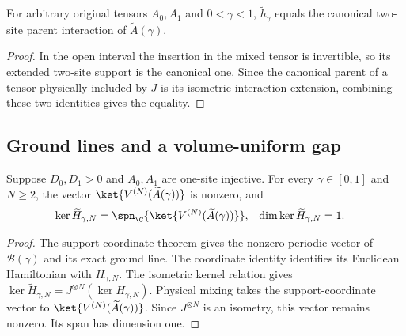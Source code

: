 \begin{lemma}
    \label{thm:mpo_arbitrary_interior_parent}
    \leanok
    For arbitrary original tensors $A_0,A_1$ and $0<\gamma<1$,
    $\widetilde h_\gamma$ equals the canonical two-site parent
    interaction of $\widetilde A(\gamma)$.
\end{lemma}
\begin{proof}\leanok
    In the open interval the insertion in the mixed tensor is invertible,
    so its extended two-site support is the canonical one. Since the
    canonical parent of a tensor physically included by $J$ is its
    isometric interaction extension, combining these two identities
    gives the equality.
\end{proof}

\subsection{Ground lines and a volume-uniform gap}

\begin{lemma}
    \label{thm:mpo_arbitrary_periodic_ground_line}
    \leanok
    Suppose $D_0,D_1>0$ and $A_0,A_1$ are one-site injective.
    For every $\gamma\in[0,1]$ and $N\geq2$, the vector
    $\ket{V^{(N)}(\widetilde A(\gamma))}$ is nonzero, and
    \begin{align}
        \ker\widetilde H_{\gamma,N}
         & =\spn_{\C}\{\ket{V^{(N)}(\widetilde A(\gamma))}\},
         & \dim\ker\widetilde H_{\gamma,N}                    & =1.
        \label{eq:mpo_arbitrary_ground_line}
    \end{align}
\end{lemma}
\begin{proof}\leanok
    The support-coordinate theorem gives the nonzero periodic vector
    of $\mathcal B(\gamma)$ and its exact ground line.
    The coordinate identity identifies its Euclidean Hamiltonian with
    $H_{\gamma,N}$. The isometric kernel relation gives
    $\ker\widetilde H_{\gamma,N}=J^{\otimes N}(\ker H_{\gamma,N})$.
    Physical mixing takes the support-coordinate vector to
    $\ket{V^{(N)}(\widetilde A(\gamma))}$. Since $J^{\otimes N}$ is
    an isometry, this vector remains nonzero. Its span has dimension one.
\end{proof}


